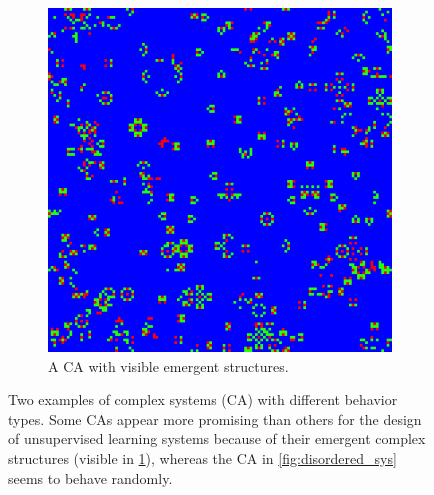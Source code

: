 \begin{enumerate}
\begin{figure}[htbp]
\begin{subfigure}[t]{.4\linewidth}
  \includegraphics[width=\linewidth]{figures/micro4.png}
  \caption{A \acl{CA} with visible emergent structures.}
  \label{fig:structured_sys}
\end{subfigure}
\caption{Two examples of complex systems (\acf{CA}) with different behavior
  types. Some \acp{CA} appear more promising than others for the design of
  unsupervised learning systems because of their emergent complex structures
  (visible in \ref{fig:structured_sys}), whereas the \ac{CA} in
  \ref{fig:disordered_sys} seems to behave randomly.}
  \label{fig:comparison_ca}
\end{figure}


\end{enumerate}
